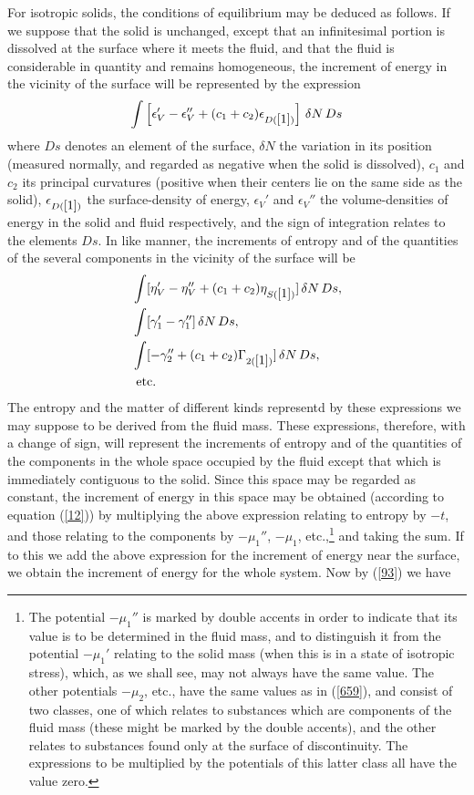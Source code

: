 \documentclass[12pt]{article}
\newcommand{\dd}{\delta}
\begin{document}
For isotropic solids, the conditions of equilibrium may be deduced as follows. If we suppose that the solid is unchanged, except that an infinitesimal portion is dissolved at the surface where it meets the fluid, and that the fluid is considerable in quantity and remains homogeneous, the increment of energy in the vicinity of the surface will be represented by the expression
$$\int \left[\epsilon_V'-\epsilon_V'' + (c_1 + c_2)\epsilon_{D(\ref{1})}\right] \, \dd N \,Ds$$
where $Ds$ denotes an element of the surface, $\dd N$ the variation in its position (measured normally, and regarded as negative when the solid is dissolved), $c_1$ and $c_2$ its principal curvatures (positive when their centers lie on the same side as the solid), $\epsilon_{D(\ref{1})}$ the surface-density of energy, $\epsilon_V'$ and $\epsilon_V''$ the volume-densities of energy in the solid and fluid respectively, and the sign of integration relates to the elements $Ds$. In like manner, the increments of entropy and of the quantities of the several components in the vicinity of the surface will be
\begin{align*}
& \int[\eta_V'-  \eta_V'' + (c_1 + c_2)\eta_{S(\ref{1})}] \, \dd N \, Ds,\\
& \int[\gamma_1'-\gamma_1''] \, \dd N \, Ds, \\
& \int[-\gamma_2'' +(c_1 + c_2)\Gamma_{2(\ref{1})}]\, \dd N \, Ds, \\
& \text{  etc.}\end{align*}
The entropy and the matter of different kinds representd by these expressions we may suppose to be derived from the fluid mass. These expressions, therefore, with a change of sign, will represent the increments of entropy and of the quantities of the components in the whole space occupied by the fluid except that which is immediately contiguous to the solid. Since this space may be regarded as constant, the increment of energy in this space may be obtained (according to equation (\ref{12})) by multiplying the above expression relating to entropy by $-t$, and those relating to the components by $-\mu_1''$, $-\mu_1$, etc.,\footnote{The potential $-\mu_1''$ is marked by double accents in order to indicate that its value is to be determined in the fluid mass, and to distinguish it from the potential $-\mu_1'$ relating to the solid mass (when this is in a state of isotropic stress), which, as we shall see, may not always have the same value. The other potentials $-\mu_2$, etc., have the same values as in (\ref{659}), and consist of two classes, one of which relates to substances which are components of the fluid mass (these might be marked by the double accents), and the other relates to substances found only at the surface of discontinuity. The expressions to be multiplied by the potentials of this latter class all have the value zero.} and taking the sum. If to this we add the above expression for the increment of energy near the surface, we obtain the increment of energy for the whole system. Now by (\ref{93}) we have
\end{document}

